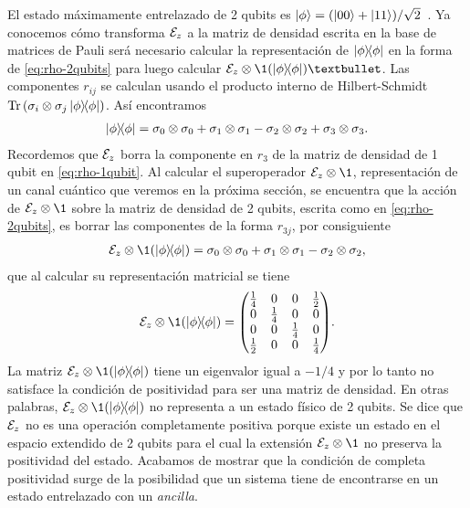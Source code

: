 El estado máximamente entrelazado de 2 qubits es
$\ket{\phi}=\qty(\ket{00}+\ket{11})/\sqrt{2}$~\cite{bengtsson_zyczkowski_2017}.
Ya conocemos cómo transforma $\mathcal{E}_z$ a la matriz de densidad 
escrita en la base de matrices de Pauli será necesario calcular 
la representación de $\dyad{\phi}{\phi}$ en la forma de \eqref{eq:rho-2qubits}
para luego calcular $\E_z\ot \1(\dyad{\phi}{\phi})•$.
Las componentes $r_{ij}$ se calculan usando el producto interno
de Hilbert-Schmidt $\Tr\qty(\pauli{i}{j}\dyad{\phi}{\phi})$.
Así encontramos 
\begin{align}
\dyad{\phi}{\phi}=
\pauli{0}{0}+\pauli{1}{1}-\pauli{2}{2}+\pauli{3}{3}.
\end{align}
Recordemos que $\mathcal{E}_z$ borra la componente en $r_3$ de la
matriz de densidad de 1 qubit en \eqref{eq:rho-1qubit}. 
Al calcular el superoperador $\E_z\ot  \1$, representación de 
un canal cuántico que veremos en la próxima sección, se encuentra
que la acción de $\E_z\otimes\1$ sobre la matriz de densidad de 2 qubits,
escrita como en \eqref{eq:rho-2qubits}, es borrar 
las componentes de la forma $r_{3j}$,
 
por consiguiente
\begin{align}
\E_z\otimes\1 \qty(\dyad{\phi}{\phi})=
\pauli{0}{0}+\pauli{1}{1}-\pauli{2}{2},
\end{align}
que al calcular su representación matricial se tiene
\begin{align}
\E_z\otimes\1 \qty(\dyad{\phi}{\phi})=
\mqty( 
\frac{1}{4} & 0 & 0 & \frac{1}{2} \\
0 & \frac{1}{4} & 0 & 0 \\
0 & 0 & \frac{1}{4} & 0 \\
\frac{1}{2} & 0 & 0 & \frac{1}{4} \\
).
\end{align}
La matriz  $\E_z\otimes\1\qty(\dyad{\phi}{\phi})$ tiene un 
eigenvalor igual a $-1/4$ y por lo tanto no satisface la condición 
de positividad para ser una matriz de densidad.  
En otras palabras, $\E_z\otimes\1\qty(\dyad{\phi}{\phi})$ 
no representa a un estado físico de 2 qubits.
Se dice que $\mathcal{E}_z$ no es una operación completamente 
positiva porque existe un estado en el espacio extendido de 2 qubits para 
el cual la extensión $\E_z\ot \1$ no preserva la positividad del estado. 
Acabamos de mostrar que la condición de completa
positividad surge de la posibilidad que un sistema tiene de encontrarse 
en un estado entrelazado con un \textit{ancilla}.

